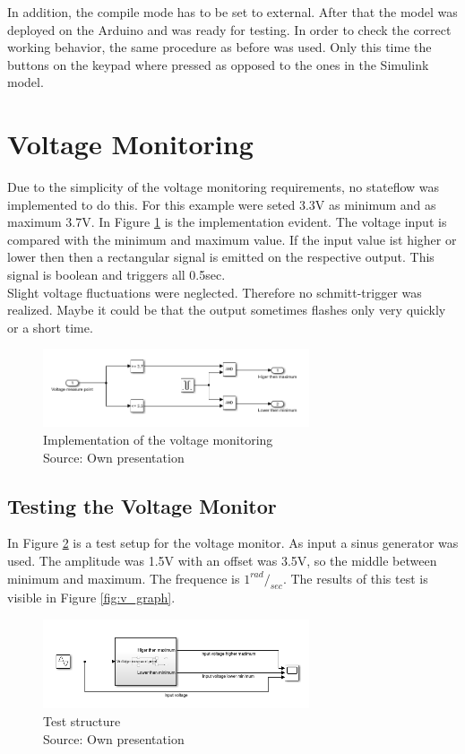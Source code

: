 		In addition, the compile mode has to be set to external. After that the model was deployed on the Arduino and was ready for testing. In order to check the correct working behavior, the same procedure as before was used. Only this time the buttons on the keypad where pressed as opposed to the ones in the Simulink model.

	
	
	\section{Voltage Monitoring}
	Due to the simplicity of the voltage monitoring requirements, no stateflow was implemented to do this. For this example were seted 3.3V as minimum  and as maximum 3.7V. In Figure \ref{fig:v_mon} is the implementation evident. The voltage input is compared with the minimum and maximum value. If the input value ist higher or lower then then a rectangular signal is emitted on the respective output. This signal is boolean and triggers all 0.5sec. \\
	Slight voltage fluctuations were neglected. Therefore no schmitt-trigger was realized. Maybe it could be that the output sometimes flashes only very quickly or a short time. 
		\begin{figure}[H]
			\centering
			\includegraphics[width=0.7\textwidth]{figures/v_monitor.png}
			\caption[Implementation of the voltage monitoring]{Implementation of the voltage monitoring\\ Source: Own presentation}
			\label{fig:v_mon}
		\end{figure}
		\subsection{Testing the Voltage Monitor}
		In Figure \ref*{fig:v_test} is a test setup for the voltage monitor. As input a sinus generator was used. The amplitude was 1.5V with an offset was 3.5V, so the middle between minimum and maximum. The frequence is $1^{rad}/_{sec}.$ The results of this test is visible in Figure \ref{fig:v_graph}.
			\begin{figure}[H]
				\centering
				\includegraphics[width=0.7\textwidth]{figures/v_monitor_testcase.png}
				\caption[Test structure]{Test structure\\ Source: Own presentation}
				\label{fig:v_test}
			\end{figure}
			
